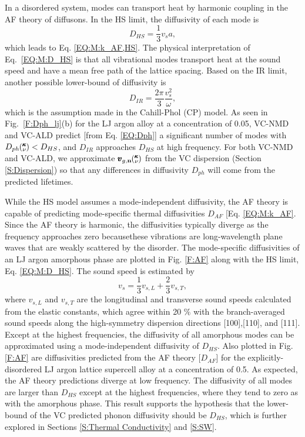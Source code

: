 \documentclass[aps,prb,onecolumn,preprint,footinbib,superscriptaddress,amsmath,amssymb,floatfix]{revtex4}
\newcommand{\kv}{\mspace{-4.0mu}\left(\mspace{-8.0mu}
\begin{smallmatrix}&\pmb{\kappa} \\&\nu\end{smallmatrix}
\mspace{-3.0mu}\right)}
\begin{document}
In a disordered system,  
modes can transport heat by harmonic coupling in the AF theory of 
diffusons.\cite{allen_thermal_1993} In the HS limit,
\cite{cahill_lattice_1988} 
the diffusivity of each mode is
\begin{equation}\label{EQ:M:D_HS}
D_{HS} = \frac{1}{3} v_s a,
\end{equation}
which leads to Eq. \eqref{EQ:M:k_AF,HS}.\cite{vc_fn3} 
The physical interpretation of Eq.~\eqref{EQ:M:D_HS} 
is that all vibrational modes transport heat at the sound speed 
and have a mean free path of the lattice spacing. 
Based on the IR limit, another possible lower-bound of 
diffusivity is  
\begin{equation}\label{EQ:M:D_IR}
D_{IR} = \frac{2\pi}{3} \frac{v^2_s}{\omega}, 
\end{equation}
which is the assumption made in the Cahill-Phol (CP) model.
\cite{cahill_lattice_1988} 
As seen in Fig.~\ref{F:Dph_lj}(b) for the LJ argon alloy at 
a concentration of 0.05, VC-NMD and VC-ALD predict [from 
Eq. \eqref{EQ:Dph}] a significant number of modes with  
$D_{ph}\kv < D_{HS}$, and $D_{IR}$ approaches $D_{HS}$ at 
high frequency. For both VC-NMD and VC-ALD, we 
approximate $\pmb{v}_{g,\mathbf{n}}\kv$ from the VC dispersion 
(Section \ref{S:Dispersion}) so that any differences in 
diffusivity $D_{ph}$ will come from the predicted lifetimes. 

While the HS model assumes a mode-independent diffusivity, 
the AF theory is capable of predicting mode-specific thermal 
diffusivities $D_{AF}$ [Eq. \eqref{EQ:M:k_AF}.
\cite{feldman_thermal_1993,feldman_numerical_1999,
shenogin_predicting_2009} Since the AF theory is harmonic, the 
diffusivities typically diverge as the frequency approaches zero 
becausethese vibrations are long-wavelength plane waves  
that are weakly scattered by the disorder.
\cite{sheng_introduction_2006,vitelli_heat_2010}
The mode-specific diffusivities of an LJ argon amorphous 
phase\cite{vc_fn4} are plotted in Fig. \ref{F:AF} along with the HS 
limit, Eq. \eqref{EQ:M:D_HS}. The sound speed is estimated by 
\begin{equation}\label{EQ:M:vs}
v_s = \frac{1}{3}v_{s,L} + \frac{2}{3}v_{s,T},
\end{equation}
where $v_{s,L}$ and $v_{s,T}$ are the longitudinal and transverse 
sound speeds calculated from the elastic constants,
\cite{gale_general_2003} which agree within 20 $\%$ with the 
branch-averaged sound speeds along the high-symmetry dispersion 
directions [100],[110], and [111]. 
Except at the highest frequencies, the diffusivity of all amorphous 
modes can be approximated using a mode-independent diffusivity of $D_{HS}$. 
Also plotted in Fig. \ref{F:AF} are 
diffusivities predicted from the AF theory [$D_{AF}$] for the 
explicitly-disordered LJ argon lattice supercell  
alloy at a concentration of 0.5. As expected, the AF theory 
predictions diverge at low frequency.\cite{vc_fn5} 
The diffusivity of all modes are larger than $D_{HS}$ except 
at the highest frequencies, where they tend to zero as with the amorphous 
phase. This result supports the hypothesis that the lower-bound of the 
VC predicted phonon diffusivity should be $D_{HS}$, which 
is further explored in Sections \ref{S:Thermal Conductivity} and 
\ref{S:SW}.
\end{document}
